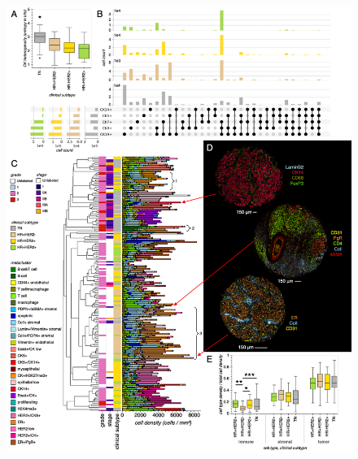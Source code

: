 \documentclass[preprint,review,3p,12pt]{elsarticle}
\begin{document}
\begin{figure}[p]
\centering\includegraphics[width=\linewidth,
                 keepaspectratio]{fig2_secondrevision}
\caption{}
\label{fig:fig2}
\end{figure}

\newpage
\end{document}
